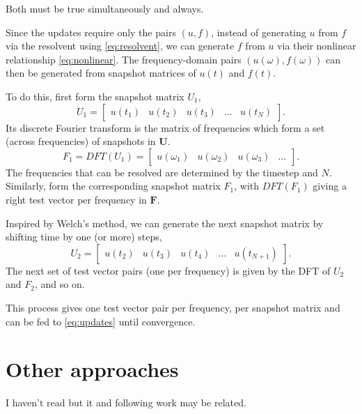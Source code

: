 \documentclass[onecolumn, twoside, 11pt]{article}
\newcommand\mU{\mathbf{U}}
\newcommand\mF{\mathbf{F}}
\begin{document}
Both must be true simultaneously and always.

Since the updates require only the pairs $(u,f)$, instead of generating $u$ from $f$ via the resolvent using \eqref{eq:resolvent}, we can generate $f$ from $u$ via their nonlinear relationship \eqref{eq:nonlinear}. The frequency-domain pairs $(u(\omega), f(\omega))$ can then be generated from snapshot matrices of $u(t)$ and $f(t)$.

To do this, first form the snapshot matrix $U_1$,
\[U_1 = \left[
        \begin{array}{ccccc}
            u(t_1) & u(t_2) & u(t_3) & \ldots & u(t_N)
        \end{array}
    \right].
\]
Its discrete Fourier transform is the matrix of frequencies which form a set (across frequencies) of snapshots in $\mU$.
\[ F_1 = DFT(U_1) = \left[
        \begin{array}{ccccc}
            u(\omega_1) & u(\omega_2) & u(\omega_3) & \ldots 
        \end{array}
    \right].
\]
The frequencies that can be resolved are determined by the timestep and $N$.
Similarly, form the corresponding snapshot matrix $F_1$, with $DFT(F_1)$ giving a right test vector per frequency in $\mF$.

Inspired by Welch's method, we can generate the next snapshot matrix by shifting time by one (or more) steps,
\[U_2 = \left[
        \begin{array}{ccccc}
            u(t_2) & u(t_3) & u(t_4) & \ldots & u(t_{N+1})
        \end{array}
    \right].
\]
The next set of test vector pairs (one per frequency) is given by the DFT of $U_2$ and $F_2$, and so on.

This process gives one test vector pair per frequency, per snapshot matrix and can be fed to \eqref{eq:updates} until convergence.

\section{Other approaches}

I haven't read \cite{towne2015proceedings} but it and following work may be related.



\end{document}
